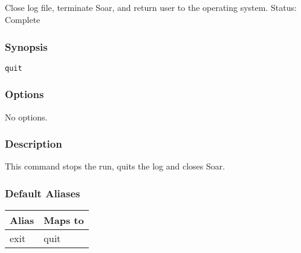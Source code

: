 \subsection{}
\label{quit}
Close log file, terminate Soar, and return user to the operating system. 
 Status: Complete
\subsubsection*{Synopsis}
\begin{verbatim}
quit
\end{verbatim}
\subsubsection*{Options}
 No options. 
\subsubsection*{Description}
 This command stops the run, quits the log and closes Soar. 
\subsubsection*{Default Aliases}
\begin{tabular}{|l|l|}
\hline 
 Alias  & Maps to  \\
 \hline 
 exit  & quit  \\
 \hline 
\end{tabular}
